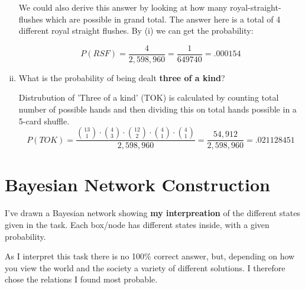 \documentclass{article}
\begin{document}
\begin{enumerate}[(i)]
We could also derive this answer by looking at how many royal-straight-flushes which are possible in grand total. The answer here is a total of 4 different royal straight flushes. By (i) we can get the probability:

\begin{equation}
P(RSF) = \frac{4}{2,598,960} = \frac{1}{649740} = .000154
\end{equation}


\item What is the probability of being dealt {\bf three of a kind}?

Distrubution of 'Three of a kind' (TOK) is calculated by counting total number of possible hands and then dividing this on total hands possible in a 5-card shuffle.
\begin{equation}
P(TOK) = \frac{\binom{13}{1} \cdot \binom{4}{3} \cdot \binom{12}{2} \cdot \binom{4}{1} \cdot \binom{4}{1}}{2,598,960} = \frac{54,912}{2,598,960} = .021128451
\end{equation}
\end{enumerate}

\newpage
\section*{Bayesian Network Construction}

I've drawn a Bayesian network showing {\bf my interpreation} of the different states given in the task.
Each box/node has different states inside, with a given probability.

As I interpret this task there is no 100\% correct answer, but, depending on how you view the world and the society a variety of different solutions. I therefore chose the relations I found most probable. \\

\end{document}
